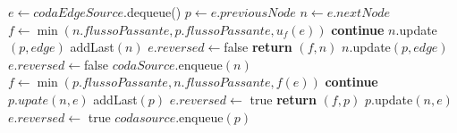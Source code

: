 \documentclass{article}
\begin{document}
\begin{algorithm}
    \begin{algorithmic}
        \STATE $e \leftarrow codaEdgeSource.$dequeue()
        \STATE $p \leftarrow e.previousNode$
        \STATE $n \leftarrow e.nextNode$
        \STATE $f \leftarrow \min(n.flussoPassante, p.flussoPassante, u_f(e))$
        \STATE \textbf{continue}
        \ENDIF
        \STATE $n.$update$(p,edge)$
        \STATE addLast$(n)$
        \STATE $e.reversed \leftarrow $false
        \STATE \textbf{return} $(f,n)$
        \ENDIF
        \ELSE
        \STATE $n.$update$(p,edge)$
        \STATE $e.reversed \leftarrow $false
        \STATE $codaSource.$enqueue$(n)$
        \ENDIF
        \STATE $f \leftarrow \min (p.flussoPassante,n.flussoPassante,f(e))$
        \STATE \textbf{continue}
        \ENDIF
        \STATE $p.upate(n,e)$
        \STATE addLast$(p)$
        \STATE $e.reversed \leftarrow $ true
        \STATE \textbf{return} $(f,p)$
        \ENDIF
        \ELSE
        \STATE $p.$update$(n,e)$
        \STATE $e.reversed \leftarrow $ true
        \STATE $codasource.$enqueue$(p)$
        \ENDIF
        \ENDIF
        \ENDIF
    \end{algorithmic}
\end{algorithm}
\newpage
\end{document}
